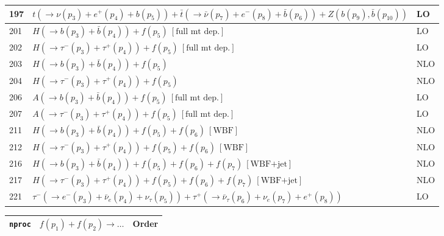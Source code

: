 \documentclass[12pt]{article}
\begin{document}
\begin{itemize}
\begin{table}
\begin{center}
\begin{tabular}{|l|l|l|}
197& $ t(\to \nu(p_3)+e^+(p_4)+b(p_5))+\bar{t}(\to \bar{\nu}(p_7)+e^-(p_8)+\bar{b}(p_6))+Z(b(p_9),\bar{b}(p_{10})) $ & LO \\
\hline 
201& $ H(\to b(p_3)+\bar{b}(p_4)) + f(p_5) ~[ \mbox{full mt dep.} ] $ & LO \\
202& $ H(\to \tau^-(p_3)+\tau^+(p_4)) + f(p_5) ~[ \mbox{full mt dep.} ] $ & LO \\
203& $ H(\to b(p_3)+\bar{b}(p_4)) + f(p_5) $ & NLO \\
204& $ H(\to \tau^-(p_3)+\tau^+(p_4)) + f(p_5) $ & NLO \\
206& $ A(\to b(p_3)+\bar{b}(p_4)) + f(p_5) ~[ \mbox{full mt dep.} ] $ & LO \\
207& $ A(\to \tau^-(p_3)+\tau^+(p_4)) + f(p_5) ~[ \mbox{full mt dep.} ] $ & LO \\
\hline 
211& $ H(\to b(p_3)+\bar{b}(p_4))+f(p_5)+f(p_6) ~[ \mbox{WBF} ] $ & NLO \\
212& $ H(\to \tau^-(p_3)+\tau^+(p_4))+f(p_5)+f(p_6) ~[ \mbox{WBF} ] $ & NLO \\
216& $ H(\to b(p_3)+\bar{b}(p_4))+f(p_5)+f(p_6)+f(p_7) ~[ \mbox{WBF+jet} ] $ & NLO \\
217& $ H(\to \tau^-(p_3)+\tau^+(p_4))+f(p_5)+f(p_6)+f(p_7) ~[ \mbox{WBF+jet} ] $ & NLO \\
\hline 
221& $ \tau^-(\to e^-(p_3)+\bar{\nu}_e(p_4)+\nu_\tau(p_5))+\tau^+(\to \bar{\nu}_\tau(p_6)+\nu_e(p_7)+e^+(p_8)) $ & LO \\
\hline 
\end{tabular}
\end{center}
\end{table}
\begin{table}
\begin{center}
\hspace*{-1.5cm}
\begin{tabular}{|l|l|l|}
\hline
{\tt nproc} & $ f(p_1)+f(p_2) \to \ldots $& Order \\ 
\hline


\end{tabular}
\end{center}
\end{table}
\end{itemize}
\end{document}
